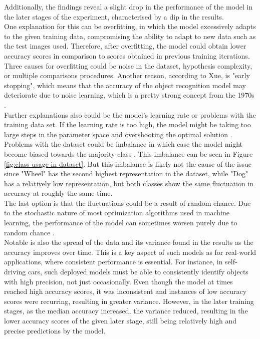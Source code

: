 
Additionally, the findings reveal a slight drop in the performance of the model in the later stages of the experiment, 
characterised by a dip in the results.\\
One explanation for this can be overfitting, in which the model excessively adapts to the given training data, compromising the ability to 
adapt to new data such as the test images used. Therefore, after overfitting, the model could obtain lower accuracy scores in comparison 
to scores obtained in previous training iterations. Three causes for overfitting could be noise in the dataset, 
hypothesis complexity, or multiple comparisons procedures. Another reason, according to Xue, is "early stopping",
which means that the accuracy of the object recognition model may deteriorate due to noise learning,
which is a pretty strong concept from the 1970s \parencite[1--2]{Xue2019}.\\
Further explanations also could be the model's learning rate or problems with the training data set. If the learning rate is too high, the
model might be taking too large steps in the parameter space and overshooting the optimal solution \parencite{GreatLearningTeam2020}.
Problems with the dataset could be imbalance in which case the model might become biased towards the majority class \parencite{Brownlee2019a} . 
This imbalance can be seen in Figure \ref{fig:class-usage-in-dataset}. But this imbalance is likely not the cause of the issue since 
"Wheel" has the second highest representation in the dataset, while "Dog" has a relatively low representation, but both classes show the same 
fluctuation in accuracy at roughly the same time.\\
The last option is that the fluctuations could be a result of random chance. Due to the stochastic nature of most optimization algorithms
used in machine learning, the performance of the model can sometimes worsen purely due to random chance \parencite{Brownlee2021}.\\


Notable is also the spread of the data and its variance found in the results as the accuracy improves over time. This is a key aspect of such models as for real-world applications, where consistent performance is essential. For instance, in self-driving cars, such deployed models must be able to consistently identify objects with high precision, not just occasionally. Even though the model at times reached high accuracy scores, it was inconsistent and instances of low accuracy scores were recurring, resulting in greater variance. However, in the later training stages,  as the median accuracy increased, the variance reduced, resulting in the lower accuracy scores of the given later stage, still being relatively high and precise predictions by the model.   \\

